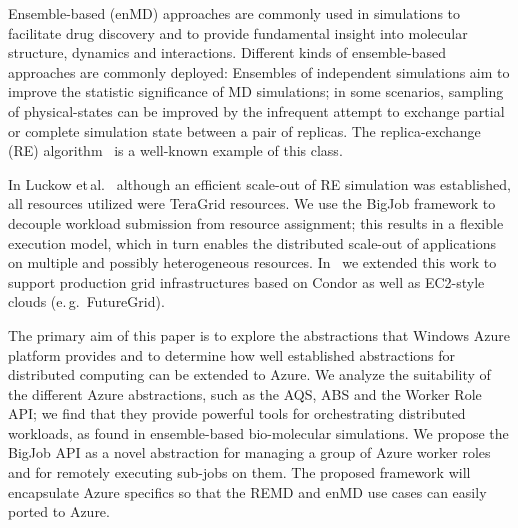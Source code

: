\documentclass[conference,final]{IEEEtran}
\newcommand{\alnote}[1]{ {\textcolor{blue} { ***AL: #1 }}}
\newcommand{\jhanote}[1]{ {\textcolor{red} { ***SJ: #1 }}}
\newcommand{\alnote}[1]{}
\newcommand{\jhanote}[1]{}
\begin{document}
Ensemble-based (enMD) approaches are commonly used in simulations to
facilitate drug discovery and to provide fundamental insight into
molecular structure, dynamics and interactions.  Different kinds of
ensemble-based approaches are commonly deployed: Ensembles of
independent simulations aim to improve the statistic significance of
MD simulations; %
in some scenarios, sampling of physical-states can be improved by the
infrequent attempt to exchange partial or complete simulation state
between a pair of replicas. The replica-exchange (RE)
algorithm~\cite{hansmann} is a well-known example of this class. 

In Luckow et\,al.~\cite{repex_ptrs} although an efficient scale-out of RE
simulation was established, all resources utilized were TeraGrid
resources. We use the BigJob framework to decouple workload
submission from resource assignment; this results in a flexible
execution model, which in turn enables the distributed scale-out of
applications on multiple and possibly heterogeneous resources.
In~\cite{10.1109/CCGRID.2010.91} we extended this work to support
production grid infrastructures based on Condor as well as EC2-style
clouds (e.\,g.\ FutureGrid).
 
The primary aim of this paper is to explore the abstractions that
Windows Azure platform provides and to determine how well established
abstractions for distributed computing can be extended to Azure.
We analyze the suitability of the different Azure abstractions, such
as the AQS, ABS and the Worker Role API; we find that they provide
powerful tools for orchestrating distributed workloads, as found in
ensemble-based bio-molecular simulations.
We propose the BigJob API as a novel abstraction for managing a group
of Azure worker roles and for remotely executing sub-jobs on them. The
proposed framework will encapsulate Azure specifics so that the REMD
and enMD use cases can easily ported to Azure.  %
\end{document}
